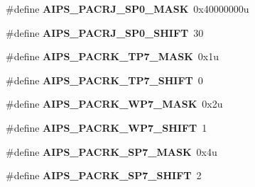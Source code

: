 \begin{DoxyCompactItemize}
\item 
\hypertarget{group___a_i_p_s___register___masks_ga664f29205468e6749a47af7bd545d08f}{}\#define {\bfseries A\+I\+P\+S\+\_\+\+P\+A\+C\+R\+J\+\_\+\+S\+P0\+\_\+\+M\+A\+S\+K}~0x40000000u\label{group___a_i_p_s___register___masks_ga664f29205468e6749a47af7bd545d08f}

\item 
\hypertarget{group___a_i_p_s___register___masks_ga57c9252b7528b84030d20ba75ecc2ef6}{}\#define {\bfseries A\+I\+P\+S\+\_\+\+P\+A\+C\+R\+J\+\_\+\+S\+P0\+\_\+\+S\+H\+I\+F\+T}~30\label{group___a_i_p_s___register___masks_ga57c9252b7528b84030d20ba75ecc2ef6}

\item 
\hypertarget{group___a_i_p_s___register___masks_ga15885b46fbd0c0efcc75fb7860aa135c}{}\#define {\bfseries A\+I\+P\+S\+\_\+\+P\+A\+C\+R\+K\+\_\+\+T\+P7\+\_\+\+M\+A\+S\+K}~0x1u\label{group___a_i_p_s___register___masks_ga15885b46fbd0c0efcc75fb7860aa135c}

\item 
\hypertarget{group___a_i_p_s___register___masks_ga00fb08763e8a85d9446f9bc4a49999d7}{}\#define {\bfseries A\+I\+P\+S\+\_\+\+P\+A\+C\+R\+K\+\_\+\+T\+P7\+\_\+\+S\+H\+I\+F\+T}~0\label{group___a_i_p_s___register___masks_ga00fb08763e8a85d9446f9bc4a49999d7}

\item 
\hypertarget{group___a_i_p_s___register___masks_ga5059b2dfaaa78821e989bbc596dc0dc9}{}\#define {\bfseries A\+I\+P\+S\+\_\+\+P\+A\+C\+R\+K\+\_\+\+W\+P7\+\_\+\+M\+A\+S\+K}~0x2u\label{group___a_i_p_s___register___masks_ga5059b2dfaaa78821e989bbc596dc0dc9}

\item 
\hypertarget{group___a_i_p_s___register___masks_ga6e4f5cb837b3a58b987085450642a232}{}\#define {\bfseries A\+I\+P\+S\+\_\+\+P\+A\+C\+R\+K\+\_\+\+W\+P7\+\_\+\+S\+H\+I\+F\+T}~1\label{group___a_i_p_s___register___masks_ga6e4f5cb837b3a58b987085450642a232}

\item 
\hypertarget{group___a_i_p_s___register___masks_gabe12052e7a0ae0a6b28f3ccacbd139da}{}\#define {\bfseries A\+I\+P\+S\+\_\+\+P\+A\+C\+R\+K\+\_\+\+S\+P7\+\_\+\+M\+A\+S\+K}~0x4u\label{group___a_i_p_s___register___masks_gabe12052e7a0ae0a6b28f3ccacbd139da}

\item 
\hypertarget{group___a_i_p_s___register___masks_ga2f1e1317f816d333cf287b3d33a28257}{}\#define {\bfseries A\+I\+P\+S\+\_\+\+P\+A\+C\+R\+K\+\_\+\+S\+P7\+\_\+\+S\+H\+I\+F\+T}~2\label{group___a_i_p_s___register___masks_ga2f1e1317f816d333cf287b3d33a28257}


\end{DoxyCompactItemize}

